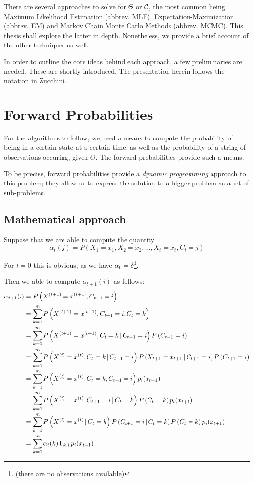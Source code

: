 There are several approaches to solve for $\Theta$ or $\mathcal{C}$, the most common being Maximum Likelihood Estimation (abbrev. MLE), Expectation-Maximization (abbrev. EM) and Markov Chain Monte Carlo Methods (abbrev. MCMC). This thesis shall explore the latter in depth. Nonetheless, we provide a brief account of the other techniques as well.

In order to outline the core ideas behind each approach, a few preliminaries are needed. These are shortly introduced. The presentation herein follows the notation in Zucchini.


\section{Forward Probabilities}
For the algorithms to follow, we need a means to compute the probability of being in a certain state at a certain time, as well as the probability of a string of observations occuring, given $\Theta$. The forward probabilities provide such a means. 

To be precise, forward probabilities provide a \textit{dynamic programming} approach to this problem; they allow us to express the solution to a bigger problem as a set of sub-problems. 


\subsection{Mathematical approach}
Suppose that we are able to compute the quantity 
\[
	\alpha_t(j) = P\left(X_1 = x_1, X_2 = x_2, \dots, X_t = x_t, C_t = j\right)
\]

For $t=0$ this is obvious, as we have $\alpha_0 = \delta$\footnote{(there are no observations available)}. 

Then we able to compute $\alpha_{t+1}(i)$ as follows:
\begin{align}
	\alpha_{t+1}(i) 
	&=  P\left(X^{(t+1)} = x^{(t+1)},  C_{t+1} = i\right) \\
	 &=  \sum_{k=1}^m P\left(X^{(t+1)} = x^{(t+1)}, C_{t+1} = i, C_t = k\right) \\ 
	 &= \sum_{k=1}^m P\left(X^{(t+1)} = x^{(t+1)}, C_t = k \, | \,  C_{t+1} = i\right) P \left( C_{t+1} = i \right) \\
	 &= \sum_{k=1}^m P\left(X^{(t)} = x^{(t)}, C_t = k \, | \,  C_{t+1} = i\right) P\left(X_{t+1} = x_{t+1} \, | \,  C_{t+1} = i\right) P \left( C_{t+1} = i \right) \\
	 &= \sum_{k=1}^m P \left( X^{(t)} = x^{(t)}, C_t = k, C_{t+1} = i  \right) p_i(x_{t+1}) \\
	 &= \sum_{k=1}^m P\left(
	 	X^{(t)} = x^{(t)}, C_{t+1} = i \, | \, C_t = k\right) P\left( C_t = k\right) p_i(x_{t+1})\\
 	&= \sum_{k=1}^m P\left(
 		X^{(t)} = x^{(t)} \, | \, C_t = k\right) P\left( C_{t+1} = i \, | \, C_t = k\right) P\left( C_t = k\right) p_i(x_{t+1})\\
 	&=  \sum_{k=1}^m \alpha_t(k)  \, \Gamma_{k, i} \, p_i(x_{t+1}) \\
 	\label{llrecursion}
\end{align}

